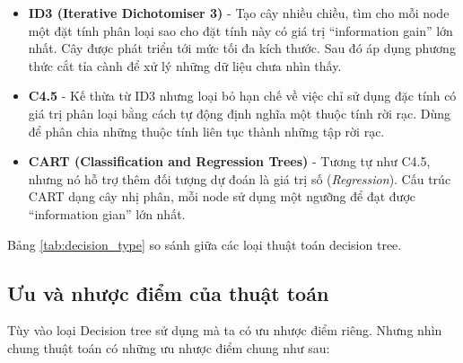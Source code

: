 \documentclass[../main-report.tex]{subfiles}
\begin{document}
\begin{itemize}
\item \textbf{ID3 (Iterative Dichotomiser 3)} - Tạo cây nhiều chiều, tìm cho mỗi node một đặt tính phân loại sao cho đặt tính này có giá trị ``information gain'' lớn nhất. Cây được phát triển tới mức tối đa kích thước. Sau đó áp dụng phương thức cắt tỉa cành để xử lý những dữ liệu chưa nhìn thấy.
\item \textbf{C4.5} - Kế thừa từ  ID3 nhưng loại bỏ hạn chế về việc chỉ sử dụng đặc tính có giá trị phân loại bằng cách tự động định nghĩa một thuộc tính rời rạc. Dùng để phân chia những thuộc tính liên tục thành những tập rời rạc.
\item \textbf{CART (Classification and Regression Trees)} - Tương tự như C4.5, nhưng nó hỗ trợ thêm đối tượng dự đoán là giá trị số (\textit{Regression}). Cấu trúc CART dạng cây nhị phân, mỗi node sử dụng một ngưỡng để đạt được ``information gian'' lớn nhất.
\end{itemize}

Bảng \ref{tab:decision_type}  so sánh giữa các loại thuật toán decision tree.
\newpage

\newpage
\subsection{Ưu và nhược điểm của thuật toán}
Tùy vào loại Decision tree sử dụng mà ta có ưu nhược điểm riêng. Nhưng nhìn chung thuật toán có những ưu nhược điểm chung như sau:
\end{document}
